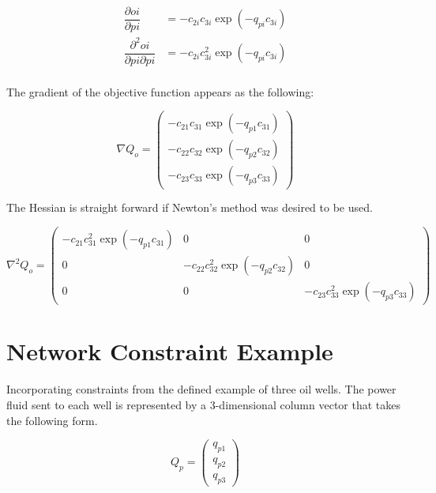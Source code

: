 \documentclass{article}
\begin{document}
\begin{equation*}
\begin{aligned}
    \dfrac{\partial oi}{\partial pi} & = - c_{2i} c_{3i} \exp{(-q_{pi} c_{3i})} \\
    \dfrac{\partial^{2} oi}{\partial pi \partial pi} & = - c_{2i} c_{3i}^{2} \exp{(-q_{pi} c_{3i})} \\
\end{aligned}
\end{equation*}

The gradient of the objective function appears as the following:

\begin{equation*}
    \nabla Q_{o} = 
    \begin{pmatrix}
    - c_{21} c_{31} \exp{(-q_{p1} c_{31})} \\[6pt]
    - c_{22} c_{32} \exp{(-q_{p2} c_{32})} \\[6pt]
    - c_{23} c_{33} \exp{(-q_{p3} c_{33})} 
    \end{pmatrix}
\end{equation*}

The Hessian is straight forward if Newton's method was desired to be used.

\begin{equation*}
    \nabla^{2} Q_{o} = 
    \begin{pmatrix}
    - c_{21} c_{31}^{2} \exp{(-q_{p1} c_{31})} & 0 & 0 \\[6pt]
    0 & - c_{22} c_{32}^{2} \exp{(-q_{p2} c_{32})} & 0 \\[6pt]
    0 & 0 & - c_{23} c_{33}^{2} \exp{(-q_{p3} c_{33})} 
    \end{pmatrix}
\end{equation*}

\section{Network Constraint Example}

Incorporating constraints from the defined example of three oil wells. The power fluid sent to each well is represented by a 3-dimensional column vector that takes the following form.

\begin{equation*}
    Q_{p} = 
    \begin{pmatrix}
    q_{p1} \\
    q_{p2} \\
    q_{p3} 
    \end{pmatrix}
\end{equation*}
\end{document}
